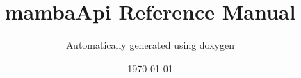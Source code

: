 \documentclass[a4paper,10pt,oneside]{article}
\title{mambaApi Reference Manual}
\author{Automatically generated using doxygen}
\date\today
\begin{document}
\mambaCover
\mambaContent
\end{document}
